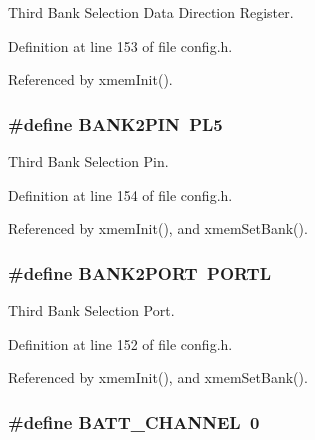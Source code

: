 Third Bank Selection Data Direction Register. 



Definition at line 153 of file config.\-h.



Referenced by xmem\-Init().

\hypertarget{group__config_ga74c95f6ccdb5e482e97a5af53ed74229}{
\subsubsection[{B\-A\-N\-K2\-P\-I\-N}]{\setlength{\rightskip}{0pt plus 5cm}\#define B\-A\-N\-K2\-P\-I\-N~P\-L5}}\label{group__config_ga74c95f6ccdb5e482e97a5af53ed74229}


Third Bank Selection Pin. 



Definition at line 154 of file config.\-h.



Referenced by xmem\-Init(), and xmem\-Set\-Bank().

\hypertarget{group__config_gad35afb0251524c201c2d60f3d035af32}{
\subsubsection[{B\-A\-N\-K2\-P\-O\-R\-T}]{\setlength{\rightskip}{0pt plus 5cm}\#define B\-A\-N\-K2\-P\-O\-R\-T~P\-O\-R\-T\-L}}\label{group__config_gad35afb0251524c201c2d60f3d035af32}


Third Bank Selection Port. 



Definition at line 152 of file config.\-h.



Referenced by xmem\-Init(), and xmem\-Set\-Bank().

\hypertarget{group__config_ga9fd748b19523c96052a2964d73a7b0f5}{
\subsubsection[{B\-A\-T\-T\-\_\-\-C\-H\-A\-N\-N\-E\-L}]{\setlength{\rightskip}{0pt plus 5cm}\#define B\-A\-T\-T\-\_\-\-C\-H\-A\-N\-N\-E\-L~0}}\label{group__config_ga9fd748b19523c96052a2964d73a7b0f5}


